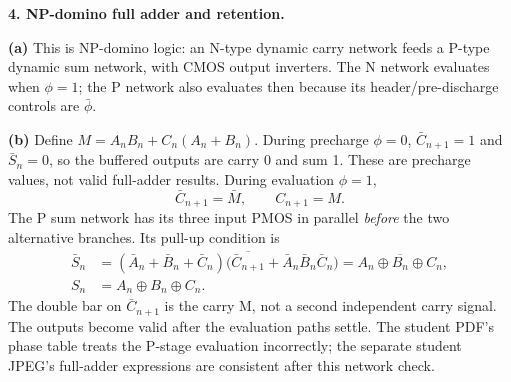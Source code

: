 \documentclass[10pt]{article}
\newcommand{\mos}[4]{\begin{scope}[shift={(#1,#2)}]
\draw (0,.24)--(0,-.24);\draw (0,.20)--(.25,.20)--(.25,.5);
\draw (0,-.20)--(.25,-.20)--(.25,-.5);\draw (-.16,.23)--(-.16,-.23);
\ifnum#4=1\draw (-.26,0) circle (.06);\draw (-.75,0)--(-.32,0);\else\draw (-.75,0)--(-.16,0);\fi
\node[anchor=east,font=\scriptsize] at (-.76,0) {$#3$};\end{scope}}
\newcommand{\ground}[2]{\draw (#1,#2)--(#1,{#2-.12});\draw ({#1-.17},{#2-.12})--({#1+.17},{#2-.12});\draw ({#1-.11},{#2-.20})--({#1+.11},{#2-.20});}
\newcommand{\rail}[3]{\draw (#1,#2)--(#1,{#2+.14});\node[above,font=\scriptsize] at (#1,{#2+.14}) {$#3$};}
\begin{document}
\newpage\textbf{4. NP-domino full adder and retention.}
\begin{center}\end{center}
\textbf{(a)} This is NP-domino logic: an N-type dynamic carry network feeds a P-type dynamic sum network, with CMOS output inverters. The N network evaluates when $\phi=1$; the P network also evaluates then because its header/pre-discharge controls are $\bar\phi$.

\textbf{(b)} Define $M=A_nB_n+C_n(A_n+B_n)$. During precharge $\phi=0$, $\bar C_{n+1}=1$ and $\bar S_n=0$, so the buffered outputs are carry 0 and sum 1. These are precharge values, not valid full-adder results. During evaluation $\phi=1$,
\[\bar C_{n+1}=\bar M,\qquad C_{n+1}=M.\]
The P sum network has its three input PMOS in parallel \emph{before} the two alternative branches. Its pull-up condition is
\[
\begin{aligned}
\bar S_n&=(\bar A_n+\bar B_n+\bar C_n)\bigl(\overline{\bar C_{n+1}}+\bar A_n\bar B_n\bar C_n\bigr)
=\overline{A_n\oplus B_n\oplus C_n},\\
S_n&=A_n\oplus B_n\oplus C_n.
\end{aligned}
\]
The double bar on $\bar C_{n+1}$ is the carry M, not a second independent carry signal. The outputs become valid after the evaluation paths settle. The student PDF's phase table treats the P-stage evaluation incorrectly; the separate student JPEG's full-adder expressions are consistent after this network check.
\end{document}
